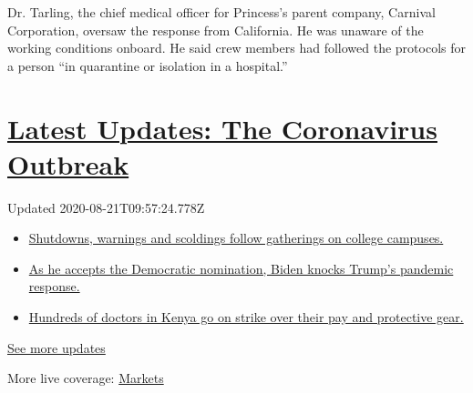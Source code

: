 Dr. Tarling, the chief medical officer for Princess's parent company,
Carnival Corporation, oversaw the response from California. He was
unaware of the working conditions onboard. He said crew members had
followed the protocols for a person ``in quarantine or isolation in a
hospital.''

\hypertarget{latest-updates-the-coronavirus-outbreak}{%
\section{\texorpdfstring{\href{https://www.nytimes3xbfgragh.onion/2020/08/21/world/covid-19-coronavirus.html?action=click\&pgtype=Article\&state=default\&region=MAIN_CONTENT_1\&context=storylines_live_updates}{Latest
Updates: The Coronavirus
Outbreak}}{Latest Updates: The Coronavirus Outbreak}}\label{latest-updates-the-coronavirus-outbreak}}

Updated 2020-08-21T09:57:24.778Z

\begin{itemize}
\tightlist
\item
  \href{https://www.nytimes3xbfgragh.onion/2020/08/21/world/covid-19-coronavirus.html?action=click\&pgtype=Article\&state=default\&region=MAIN_CONTENT_1\&context=storylines_live_updates\#link-4690b6aa}{Shutdowns,
  warnings and scoldings follow gatherings on college campuses.}
\item
  \href{https://www.nytimes3xbfgragh.onion/2020/08/21/world/covid-19-coronavirus.html?action=click\&pgtype=Article\&state=default\&region=MAIN_CONTENT_1\&context=storylines_live_updates\#link-324af071}{As
  he accepts the Democratic nomination, Biden knocks Trump's pandemic
  response.}
\item
  \href{https://www.nytimes3xbfgragh.onion/2020/08/21/world/covid-19-coronavirus.html?action=click\&pgtype=Article\&state=default\&region=MAIN_CONTENT_1\&context=storylines_live_updates\#link-35890b73}{Hundreds
  of doctors in Kenya go on strike over their pay and protective gear.}
\end{itemize}

\href{https://www.nytimes3xbfgragh.onion/2020/08/21/world/covid-19-coronavirus.html?action=click\&pgtype=Article\&state=default\&region=MAIN_CONTENT_1\&context=storylines_live_updates}{See
more updates}

More live coverage:
\href{https://www.nytimes3xbfgragh.onion/live/2020/08/20/business/stock-market-today-coronavirus?action=click\&pgtype=Article\&state=default\&region=MAIN_CONTENT_1\&context=storylines_live_updates}{Markets}

